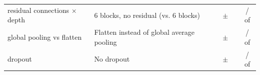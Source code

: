 \begin{tabular}{llrrcrc}
\addlinespace
residual connections $\times$ depth & 6 blocks, no residual (vs. 6 blocks) & \cnnParamsDepthSixNoResidual{} & \cnnRfSamplesDepthSixNoResidual{} & \cnnValAurocMeanDepthSixNoResidual{} $\pm$ \cnnValAurocSdDepthSixNoResidual{} & \cnnDiffMeanDepthSixNoResidual{} & \cnnNSeedsBetterDepthSixNoResidual{} / \cnnNSeedsWorseDepthSixNoResidual{} of \cnnNSeedsComparedDepthSixNoResidual{} \\
\addlinespace
global pooling vs flatten & Flatten instead of global average pooling & \cnnParamsFlatten{} & \cnnRfSamplesFlatten{} & \cnnValAurocMeanFlatten{} $\pm$ \cnnValAurocSdFlatten{} & \cnnDiffMeanFlatten{} & \cnnNSeedsBetterFlatten{} / \cnnNSeedsWorseFlatten{} of \cnnNSeedsComparedFlatten{} \\
\addlinespace
dropout & No dropout & \cnnParamsNoDropout{} & \cnnRfSamplesNoDropout{} & \cnnValAurocMeanNoDropout{} $\pm$ \cnnValAurocSdNoDropout{} & \cnnDiffMeanNoDropout{} & \cnnNSeedsBetterNoDropout{} / \cnnNSeedsWorseNoDropout{} of \cnnNSeedsComparedNoDropout{} \\
\bottomrule
\end{tabular}
